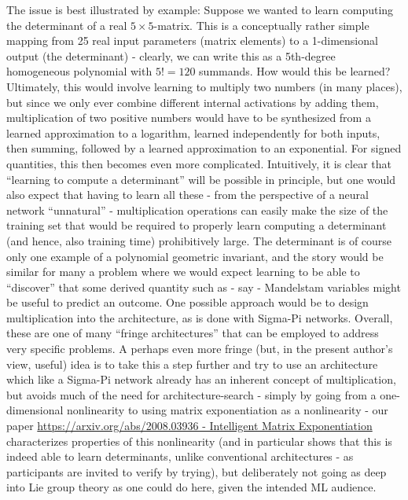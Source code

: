 \documentclass[11pt]{article}
\begin{document}
The issue is best illustrated by example: Suppose we wanted to learn
computing the determinant of a real \(5\times 5\)-matrix. This is a
conceptually rather simple mapping from 25 real input parameters (matrix
elements) to a 1-dimensional output (the determinant) - clearly, we can
write this as a 5th-degree homogeneous polynomial with \(5!=120\)
summands. How would this be learned? Ultimately, this would involve
learning to multiply two numbers (in many places), but since we only
ever combine different internal activations by adding them,
multiplication of two positive numbers would have to be synthesized from
a learned approximation to a logarithm, learned independently for both
inputs, then summing, followed by a learned approximation to an
exponential. For signed quantities, this then becomes even more
complicated. Intuitively, it is clear that ``learning to compute a
determinant'' will be possible in principle, but one would also expect
that having to learn all these - from the perspective of a neural
network ``unnatural'' - multiplication operations can easily make the
size of the training set that would be required to properly learn
computing a determinant (and hence, also training time) prohibitively
large. The determinant is of course only one example of a polynomial
geometric invariant, and the story would be similar for many a problem
where we would expect learning to be able to ``discover'' that some
derived quantity such as - say - Mandelstam variables might be useful to
predict an outcome. One possible approach would be to design
multiplication into the architecture, as is done with Sigma-Pi networks.
Overall, these are one of many ``fringe architectures'' that can be
employed to address very specific problems. A perhaps even more fringe
(but, in the present author's view, useful) idea is to take this a step
further and try to use an architecture which like a Sigma-Pi network
already has an inherent concept of multiplication, but avoids much of
the need for architecture-search - simply by going from a
one-dimensional nonlinearity to using matrix exponentiation as a
nonlinearity - our paper
\href{https://arxiv.org/abs/2008.03936}{https://arxiv.org/abs/2008.03936
- Intelligent Matrix Exponentiation} \cite{fischbacher2020intelligent} characterizes properties of this
nonlinearity (and in particular shows that this is indeed able to learn
determinants, unlike conventional architectures - as participants are
invited to verify by trying), but deliberately not going as deep into
Lie group theory as one could do here, given the intended ML audience.
\end{document}
